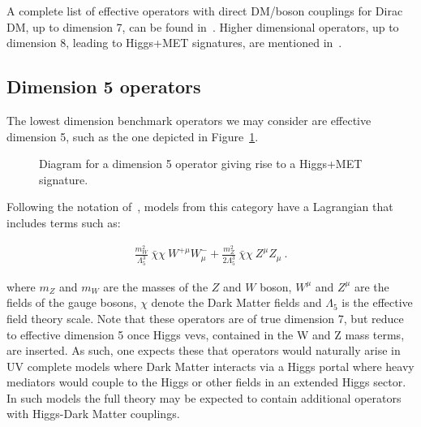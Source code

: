 
A complete list of effective operators with direct DM/boson couplings for
Dirac DM, up to dimension 7, can be found in~\cite{Cotta:2012nj, Carpenter:2012rg, Crivellin:2015wva}. 
Higher dimensional operators, up to dimension 8, leading to Higgs+MET signatures,
are mentioned in~\cite{Carpenter:2012rg, Berlin:2014cfa}. 

\subsection{Dimension 5 operators}

The lowest dimension benchmark operators we may consider are effective dimension 5,
such as the one depicted in Figure~\ref{fig:modelMonoHEFT}.  

\begin{figure}[!htb]
	\centering
	\textwidth
	\begin{feynmandiagram}[modelMonoHEFT]
	\end{feynmandiagram}
	\caption{Diagram for a dimension 5 operator giving rise to a Higgs+MET signature.}
	\label{fig:modelMonoHEFT}
\end{figure}

Following the notation of~\cite{Carpenter:2012rg},  models
from this category have a Lagrangian that includes terms such as:

\begin{eqnarray}
\frac{m_W^2}{\Lambda_5^3} ~\bar{\chi} \chi ~W^{+ \mu} W^{-}_\mu
+ \frac{m_Z^2}{2 \Lambda_5^3} ~ \bar{\chi} \chi ~ Z^\mu Z_\mu ~.
\end{eqnarray}

where $m_Z$ and $m_W$ are the masses of the $Z$ and $W$ boson, $W^{\mu}$ and $Z^{\mu}$
are the fields of the gauge bosons, $\chi$ denote the Dark Matter fields
and $\Lambda_5$ is the effective field theory scale. Note that these operators are of true dimension 7, 
but reduce to effective dimension 5 once Higgs vevs, contained in the W and Z mass terms, are inserted.  
As such, one expects  these that operators would naturally  arise in UV complete models where Dark Matter 
interacts via a Higgs portal where heavy mediators would couple to the Higgs or other fields in an extended Higgs sector. 
In such models the full theory may be expected to contain additional operators with Higgs-Dark Matter couplings. 

